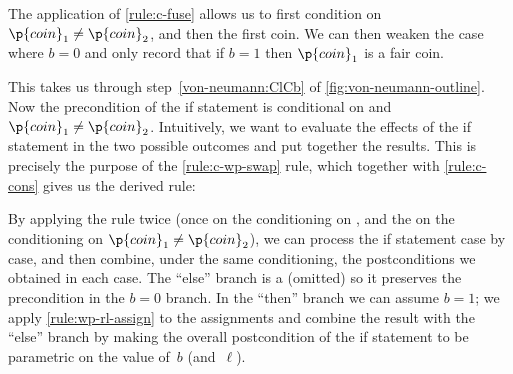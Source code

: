 The application of \ref{rule:c-fuse}
allows us to first condition on $\p{coin}_1 \ne \p{coin}_2$,
and then the first coin.
We can then weaken the case where $b=0$ and only record that
if $b=1$ then $\p{coin}_1$ is a fair coin.

This takes us through step~\eqref{von-neumann:ClCb} of \cref{fig:von-neumann-outline}.
Now the precondition of the if statement is conditional on  and
$\p{coin}_1 \ne \p{coin}_2$.
Intuitively, we want to evaluate the effects of the if statement
in the two possible outcomes and put together the results.
This is precisely the purpose of the \ref{rule:c-wp-swap} rule,
which together with \ref{rule:c-cons} gives us the derived rule:

\begin{proofrule}
  \label{rule:c-wp-elim}
\end{proofrule}

By applying the rule twice
(once on the conditioning on ,
and the on the conditioning on $\p{coin}_1 \ne \p{coin}_2$),
we can process the if statement case by case,
and then combine, under the same conditioning, the postconditions
we obtained in each case.
The ``else'' branch is a  (omitted) so it preserves the precondition
in the $b=0$ branch.
In the ``then'' branch we can assume $b=1$; we apply \ref{rule:wp-rl-assign}
to the assignments and combine the result with the ``else'' branch by making
the overall postcondition of the if statement to be parametric
on the value of~$b$ (and~$\ell$).

